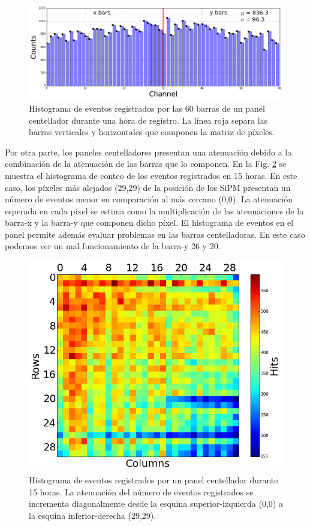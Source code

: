\begin{figure}[h!]
\centering
\includegraphics[scale=0.5]{Figures/hist2.png}
\caption{Histograma de eventos registrados por las 60 barras de un panel centellador durante una hora de registro. La línea roja separa las barras verticales y horizontales que componen la matriz de píxeles.}
\label{Bar_var}
\end{figure}

Por otra parte, los paneles centelladores presentan una atenuación debido a la combinación de la atenuación de las barras que lo componen. En la Fig. \ref{Pan_At} se muestra el histograma de conteo de los eventos registrados en 15 horas. En este caso, los píxeles más alejados (29,29) de la posición de los SiPM presentan un número de eventos menor en comparación al más cercano (0,0). La atenuación esperada en cada píxel se estima como la multiplicación de las atenuaciones de la barra-x y la barra-y que componen dicho píxel. El histograma de eventos en el panel permite además evaluar problemas en las barras centelladoras. En este caso podemos ver un mal funcionamiento de la barra-y 26 y 20.

\begin{figure}[h!]
\centering
\includegraphics[scale=0.5]{Figures/P2_15h.png}
\caption{Histograma de eventos registrados por un panel centellador durante 15 horas. La atenuación del número de eventos registrados se incrementa diagonalmente desde la esquina superior-izquierda (0,0) a la esquina inferior-derecha (29,29).}
\label{Pan_At}
\end{figure}


